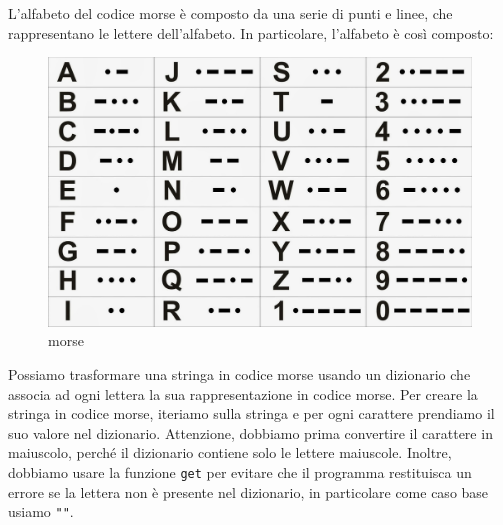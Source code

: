 \documentclass[11pt]{article}
\begin{document}
L'alfabeto del codice morse è composto da una serie di punti e linee,
che rappresentano le lettere dell'alfabeto. In particolare, l'alfabeto è
così composto:

\begin{figure}
    \centering
    \includegraphics{assets/morse.jpg}
    \caption{morse}
\end{figure}

Possiamo trasformare una stringa in codice morse usando un dizionario
che associa ad ogni lettera la sua rappresentazione in codice morse. Per
creare la stringa in codice morse, iteriamo sulla stringa e per ogni
carattere prendiamo il suo valore nel dizionario. Attenzione, dobbiamo
prima convertire il carattere in maiuscolo, perché il dizionario
contiene solo le lettere maiuscole. Inoltre, dobbiamo usare la funzione
\texttt{get} per evitare che il programma restituisca un errore se la
lettera non è presente nel dizionario, in particolare come caso base
usiamo \texttt{""}.
\end{document}
